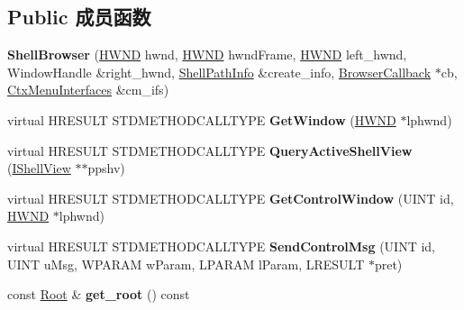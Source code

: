 \subsection*{Public 成员函数}
\begin{DoxyCompactItemize}
\item 
\mbox{\label{struct_shell_browser_a2c733275115abda08633c5b82ce94c8b}} 
{\bfseries Shell\+Browser} (\hyperlink{interfacevoid}{H\+W\+ND} hwnd, \hyperlink{interfacevoid}{H\+W\+ND} hwnd\+Frame, \hyperlink{interfacevoid}{H\+W\+ND} left\+\_\+hwnd, Window\+Handle \&right\+\_\+hwnd, \hyperlink{struct_shell_path_info}{Shell\+Path\+Info} \&create\+\_\+info, \hyperlink{struct_browser_callback}{Browser\+Callback} $\ast$cb, \hyperlink{struct_ctx_menu_interfaces}{Ctx\+Menu\+Interfaces} \&cm\+\_\+ifs)
\item 
\mbox{\label{struct_shell_browser_af2ef9484f4cdbeaa56f5d263fac35b89}} 
virtual H\+R\+E\+S\+U\+LT S\+T\+D\+M\+E\+T\+H\+O\+D\+C\+A\+L\+L\+T\+Y\+PE {\bfseries Get\+Window} (\hyperlink{interfacevoid}{H\+W\+ND} $\ast$lphwnd)
\item 
\mbox{\label{struct_shell_browser_a9789b5ddd529e03fedccf128e8f600aa}} 
virtual H\+R\+E\+S\+U\+LT S\+T\+D\+M\+E\+T\+H\+O\+D\+C\+A\+L\+L\+T\+Y\+PE {\bfseries Query\+Active\+Shell\+View} (\hyperlink{interface_i_shell_view}{I\+Shell\+View} $\ast$$\ast$ppshv)
\item 
\mbox{\label{struct_shell_browser_a726d30c8025a099982f719688a99549b}} 
virtual H\+R\+E\+S\+U\+LT S\+T\+D\+M\+E\+T\+H\+O\+D\+C\+A\+L\+L\+T\+Y\+PE {\bfseries Get\+Control\+Window} (U\+I\+NT id, \hyperlink{interfacevoid}{H\+W\+ND} $\ast$lphwnd)
\item 
\mbox{\label{struct_shell_browser_a28923301e63179739c2158ef50a819e5}} 
virtual H\+R\+E\+S\+U\+LT S\+T\+D\+M\+E\+T\+H\+O\+D\+C\+A\+L\+L\+T\+Y\+PE {\bfseries Send\+Control\+Msg} (U\+I\+NT id, U\+I\+NT u\+Msg, W\+P\+A\+R\+AM w\+Param, L\+P\+A\+R\+AM l\+Param, L\+R\+E\+S\+U\+LT $\ast$pret)
\item 
\mbox{\label{struct_shell_browser_ad4c3a1a56c5f4060abc9d073c70d54ef}} 
const \hyperlink{struct_root}{Root} \& {\bfseries get\+\_\+root} () const
\item 
$$
\end{DoxyCompactItemize}
